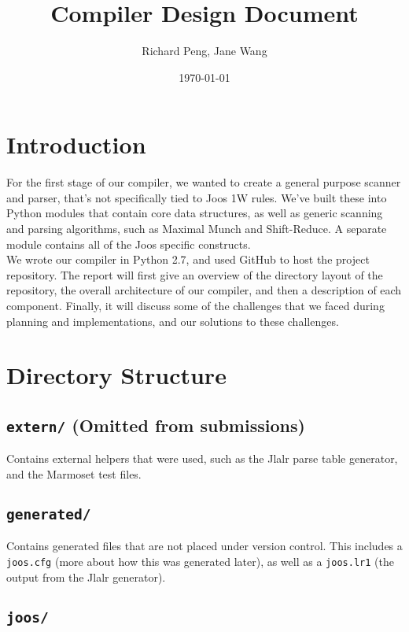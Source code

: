 \documentclass[12pt, a4paper]{article}
\title{Compiler Design Document}
\date{\today}
\author{Richard Peng, Jane Wang}
\begin{document}
\maketitle

\section{Introduction}

For the first stage of our compiler, we wanted to create a general purpose scanner and parser, that's not specifically tied to Joos 1W rules. We've built these into Python modules that contain core data structures, as well as generic scanning and parsing algorithms, such as Maximal Munch and Shift-Reduce. A separate module contains all of the Joos specific constructs. \\

We wrote our compiler in Python 2.7, and used GitHub to host the project repository. The report will first give an overview of the directory layout of the repository, the overall architecture of our compiler, and then a description of each component. Finally, it will discuss some of the challenges that we faced during planning and implementations, and our solutions to these challenges.

\section{Directory Structure}



\subsection{\texttt{extern/} (Omitted from submissions)}

Contains external helpers that were used, such as the Jlalr parse table generator, and the Marmoset test files.
 
\subsection{\texttt{generated/}}

Contains generated files that are not placed under version control. This includes a \verb|joos.cfg| (more about how this was generated later), as well as a \verb|joos.lr1| (the output from the Jlalr generator).

\subsection{\texttt{joos/}}
\end{document}
